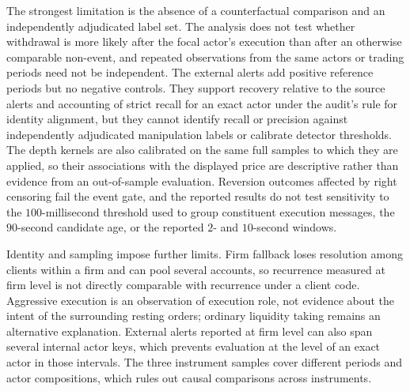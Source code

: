 \documentclass[11pt]{article}
\newenvironment{review}{\begingroup\color{blue}}{\endgroup}
\begin{document}
The strongest limitation is the absence of a counterfactual comparison and an independently adjudicated label set. The
analysis does not test whether withdrawal is more likely after the focal actor's execution than after an otherwise comparable
non-event, and repeated observations from the same actors or trading periods need not be independent. The external alerts add
positive reference periods but no negative controls. They support \begin{review}recovery relative to the source alerts and accounting of strict recall for an exact actor under the audit's rule for identity alignment\end{review}, but they cannot identify recall or precision against independently
adjudicated manipulation labels or calibrate detector thresholds. The depth kernels are also calibrated on the same full
samples to which they are applied, so their \begin{review}associations with the displayed price\end{review} are descriptive rather than \begin{review}evidence from an out-of-sample evaluation\end{review}.
\begin{review}Reversion outcomes affected by right censoring\end{review} fail the event gate, and the reported results do not test sensitivity to \begin{review}the $100$-millisecond threshold used to group constituent execution messages\end{review}, the $90$-second candidate age, or the reported $2$- and $10$-second
windows.

Identity and sampling impose further limits. Firm fallback loses \begin{review}resolution among clients within a firm\end{review} and can pool several
accounts, so \begin{review}recurrence measured at firm level\end{review} is not directly comparable with recurrence under a client code. Aggressive execution is
\begin{review}an observation of execution role\end{review}, not evidence about the intent of the surrounding resting orders; ordinary liquidity taking
remains an alternative explanation. \begin{review}External alerts reported at firm level\end{review} can also span several internal actor keys, which prevents
\begin{review}evaluation at the level of an exact actor\end{review} in those intervals. The three instrument samples cover different periods and actor compositions, which
rules out \begin{review}causal comparisons across instruments\end{review}.
\end{document}
